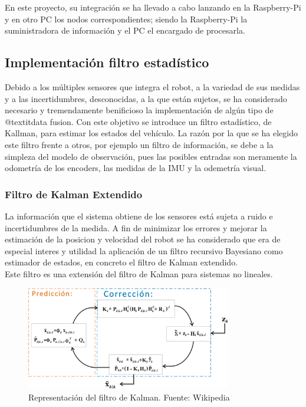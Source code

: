 En este proyecto, su integración se ha llevado a cabo lanzando en la Raspberry-Pi y en otro PC los nodos correspondientes; siendo la Raspberry-Pi la 
suministradora de información y el PC el encargado de procesarla.

\subsection{Implementación filtro estadístico}
Debido a los múltiples sensores que integra el robot, a la variedad de sus medidas y a las incertidumbres, desconocidas, a la que están sujetos, se ha considerado necesario y tremendamente benificioso la implementación de algún tipo de @textit{data fusion}. Con este objetivo se introduce un filtro estadístico, de Kallman, para estimar los estados del vehículo. La razón por la que se ha elegido este filtro frente a otros, por ejemplo un filtro de información, se debe a la simpleza del modelo de observación, pues las posibles entradas son meramente la odometría de los encoders, las medidas de la IMU y la odemetría visual.

\subsubsection{Filtro de Kalman Extendido}
La información que el sistema obtiene de los sensores está sujeta a ruido e incertidumbres de la medida. A fin de minimizar los errores y mejorar la estimación de la posicion y velocidad del robot se ha 
considerado que era de especial interes y utilidad la aplicación de un filtro recursivo Bayesiano como estimador de estados, en concreto el filtro de Kalman extendido. \\
Este filtro es una extensión del filtro de Kalman para sistemas no lineales.
\begin{figure}
    \centering
    \includegraphics[width=0.8\textwidth]{images/kalman.jpg}
    \caption{Representación del filtro de Kalman. Fuente: Wikipedia}
\end{figure}

